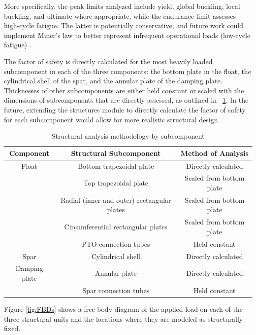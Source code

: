 More specifically, the peak limits analyzed include yield, global buckling, local buckling, and ultimate where appropriate, while the endurance limit assesses high-cycle fatigue.
The latter is potentially conservative, and future work could implement Miner's law to better represent infrequent operational loads (low-cycle fatigue) \cite{ove_arup__partners_ltd_structural_2016}. 

The factor of safety is directly calculated for the most heavily loaded subcomponent in each of the three components: the bottom plate in the float, the cylindrical shell of the spar, and the annular plate of the damping plate.
Thicknesses of other subcomponents are either held constant or scaled with the dimensions of subcomponents that are directly assessed, as outlined in \tableautorefname~\ref{tab:struct}.
In the future, extending the structures module to directly calculate the factor of safety for each subcomponent would allow for more realistic structural design.

\begin{table}
    \centering
    \begin{tabular}{ccc}
         \textbf{Component}&  \textbf{Structural Subcomponent}&  \textbf{Method of Analysis}\\ \hline
         Float&  Bottom trapezoidal plate&  Directly calculated\\
         &  Top trapezoidal plate&  Scaled from bottom plate\\
         &  Radial (inner and outer) rectangular plates&  Scaled from bottom plate\\
 & Circumferential rectangular plates& Scaled from bottom plate\\
 & PTO connection tubes& Held constant\\ \hline
 Spar& Cylindrical shell& Directly calculated\\ \hline
 Damping plate& Annular plate& Directly calculated\\
 & Spar connection tubes& Held constant\\
    \end{tabular}
    \caption{Structural analysis methodology by subcomponent}
    \label{tab:struct}
\end{table}

Figure \ref{fig:FBDs} shows a free body diagram of the applied load on each of the three structural units and the locations where they are modeled as structurally fixed.

